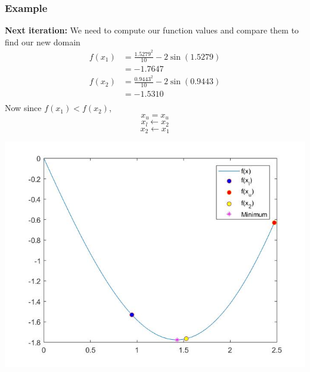 \documentclass{if-beamer}
\begin{document}
\begin{frame}
	\frametitle{Example}
	\begin{minipage}{0.4\textwidth}
		\textbf{Next iteration:} We need to compute our function values and compare them to find our new domain
		\begin{align*}
			f(x_1) &= \frac{1.5279^2}{10}-2\sin(1.5279)\\
			& = -1.7647\\
			f(x_2) &= \frac{0.9443^2}{10}-2\sin(0.9443)\\
			&= -1.5310\\
		\end{align*}
		Now since $f(x_1)<f(x_2)$,
		$$ x_u = x_u $$
		$$ x_l \leftarrow x_2$$ 
		$$ x_2 \leftarrow x_1$$
		
	\end{minipage}
	\begin{minipage}{0.6\textwidth}
		\centering
		\includegraphics[width = 1.2\textwidth]{figures/iter2half.jpg}
	\end{minipage}	
\end{frame}
\end{document}
